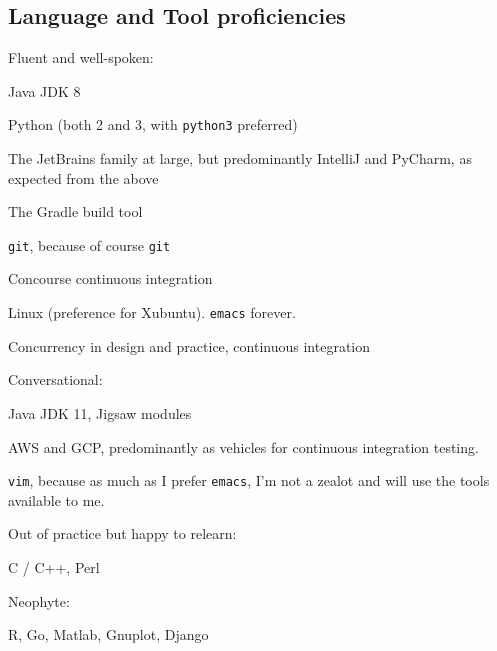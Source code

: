 \documentclass[10pt,letterpaper]{article}
\newcommand\ttt\texttt
\renewenvironment{itemize}{
  \begin{list}{}{
    \setlength{\leftmargin}{1.5em}
    \setlength{\itemsep}{0.25em}
    \setlength{\parskip}{0pt}
    \setlength{\parsep}{0.25em}
  }
}{
  \end{list}
}
\begin{document}
\subsection*{Language and Tool proficiencies}
\begin{itemize}
  \item Fluent and well-spoken:
  \begin{itemize}
    \item Java JDK 8
    \item Python (both 2 and 3, with \ttt{python3} preferred) %
    \item The JetBrains family at large, but predominantly IntelliJ and PyCharm, as expected from the above
    \item The Gradle build tool
    \item \ttt{git}, because of course \ttt{git}
    \item Concourse continuous integration
    \item Linux (preference for Xubuntu).  \ttt{emacs} forever.
    \item Concurrency in design and practice, continuous integration
  \end{itemize}
  \item Conversational:
  \begin{itemize}
    \item Java JDK 11, Jigsaw modules
    \item AWS and GCP, predominantly as vehicles for continuous integration testing.
    \item \ttt{vim}, because as much as I prefer \ttt{emacs}, I'm not a zealot and will use the tools available to me.
  \end{itemize}
  \item Out of practice but happy to relearn:
  \begin{itemize}
    \item C / C++, Perl
  \end{itemize}
  \item Neophyte:
  \begin{itemize}
    \item R, Go, Matlab, Gnuplot, Django
  \end{itemize}
\end{itemize}
\end{document}

